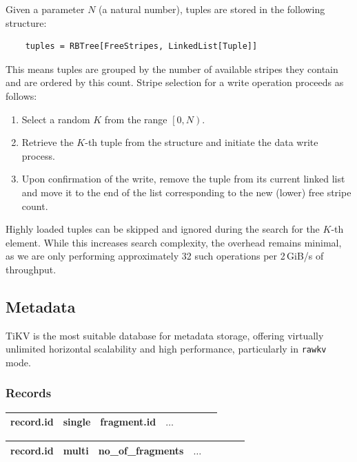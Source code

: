 \documentclass[a4paper,12pt]{article}
\begin{document}
    Given a parameter $N$ (a natural number), tuples are stored in the following structure:
    \begin{lstlisting}
    tuples = RBTree[FreeStripes, LinkedList[Tuple]]
    \end{lstlisting}
    This means tuples are grouped by the number of available stripes they contain and are ordered by this count. Stripe selection for a write operation proceeds as follows:
    \begin{enumerate}
        \item Select a random $K$ from the range $\left[ 0, N \right)$.
        \item Retrieve the $K$-th tuple from the structure and initiate the data write process.
        \item Upon confirmation of the write, remove the tuple from its current linked list and move it to the end of the list corresponding to the new (lower) free stripe count.
    \end{enumerate}
    Highly loaded tuples can be skipped and ignored during the search for the $K$-th element. While this increases search complexity, the overhead remains minimal, as we are only performing approximately 32 such operations per 2\,GiB/s of throughput.

    \subsection{Metadata}

    TiKV is the most suitable database for metadata storage, offering virtually unlimited horizontal scalability and high performance, particularly in \texttt{rawkv} mode.

    \subsubsection{Records}

    \noindent
    \begin{tabular}{|Sl|Sc|Sc|Sr|}
        \hline
        record.id & single & fragment.id & $\dots$ \\
        \hline
    \end{tabular}

    \bigskip

    \noindent
    \begin{tabular}{|Sl|Sc|Sc|Sr|}
        \hline
        record.id & multi & no\_of\_fragments & $\dots$ \\
        \hline
    \end{tabular}
\end{document}
